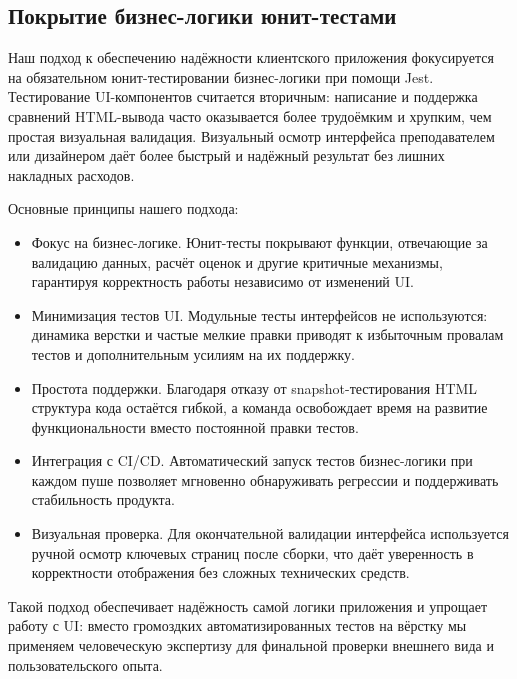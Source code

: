 \subsection{Покрытие бизнес-логики юнит-тестами}

Наш подход к обеспечению надёжности клиентского приложения фокусируется на обязательном юнит-тестировании бизнес-логики при помощи Jest. Тестирование UI-компонентов считается вторичным: написание и поддержка сравнений HTML-вывода часто оказывается более трудоёмким и хрупким, чем простая визуальная валидация. Визуальный осмотр интерфейса преподавателем или дизайнером даёт более быстрый и надёжный результат без лишних накладных расходов.

Основные принципы нашего подхода:
\begin{itemize}
  \item Фокус на бизнес-логике. Юнит-тесты покрывают функции, отвечающие за валидацию данных, расчёт оценок и другие критичные механизмы, гарантируя корректность работы независимо от изменений UI.
  \item Минимизация тестов UI. Модульные тесты интерфейсов не используются: динамика верстки и частые мелкие правки приводят к избыточным провалам тестов и дополнительным усилиям на их поддержку.
  \item Простота поддержки. Благодаря отказу от snapshot-тестирования HTML структура кода остаётся гибкой, а команда освобождает время на развитие функциональности вместо постоянной правки тестов.
  \item Интеграция с CI/CD. Автоматический запуск тестов бизнес-логики при каждом пуше позволяет мгновенно обнаруживать регрессии и поддерживать стабильность продукта.
  \item Визуальная проверка. Для окончательной валидации интерфейса используется ручной осмотр ключевых страниц после сборки, что даёт уверенность в корректности отображения без сложных технических средств.
\end{itemize}

Такой подход обеспечивает надёжность самой логики приложения и упрощает работу с UI: вместо громоздких автоматизированных тестов на вёрстку мы применяем человеческую экспертизу для финальной проверки внешнего вида и пользовательского опыта.
